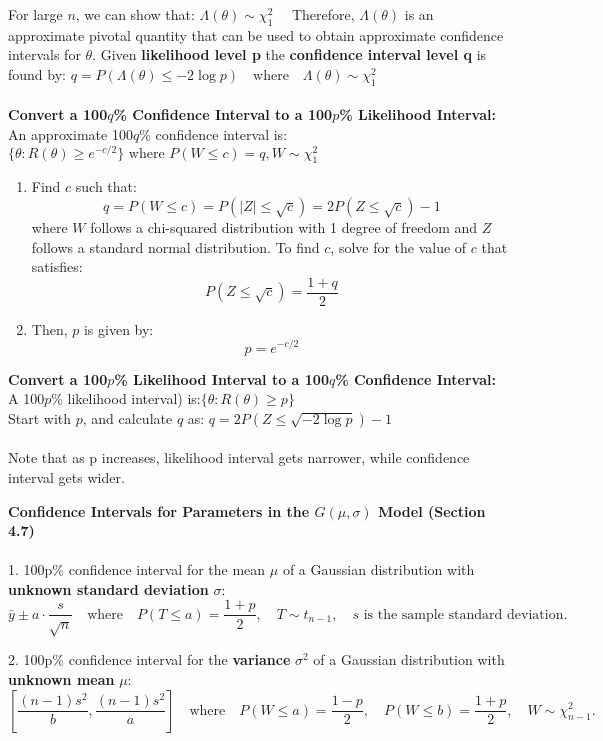 \documentclass[a4paper,12pt]{article}
\begin{document}
For large \( n \), we can show that: $
\Lambda(\theta) \sim \chi^2_1 \quad $
Therefore, \( \Lambda(\theta) \) is an approximate pivotal quantity that can be used to obtain approximate confidence intervals for \( \theta \). Given \textbf{likelihood level p} the \textbf{confidence interval level q} is found by:
$q = P(\Lambda(\theta) \leq -2 \log p) \quad \text{where} \quad \Lambda(\theta) \sim \chi^2_1
$
\\
\\ \textbf{Convert a 100$q$\% Confidence Interval to a 100$p$\% Likelihood Interval:}
\\An approximate 100$q$\% confidence interval is:
$
\{ \theta : R(\theta) \geq e^{-c/2} \} \text{ where }  P(W \leq c) = q,  W \sim \chi^2_1$
\begin{enumerate}
    \item Find \( c \) such that:
    \[
    q = P(W \leq c) = P(|Z| \leq \sqrt{c}) = 2P(Z \leq \sqrt{c}) - 1
    \]
    where \( W \) follows a chi-squared distribution with 1 degree of freedom and \( Z \) follows a standard normal distribution. To find \( c \), solve for the value of \( c \) that satisfies:
    \[
    P(Z \leq \sqrt{c}) = \frac{1 + q}{2}
    \]
    \item Then, \( p \) is given by:
    \[
    p = e^{-c/2}
    \]
\end{enumerate}

\textbf{Convert a 100$p$\% Likelihood Interval to a 100$q$\% Confidence Interval:}
\\ A 100$p$\% likelihood interval) is:$
\{ \theta : R(\theta) \geq p \}$
\\Start with \( p \), and calculate \( q \) as:
$q = 2P(Z \leq \sqrt{-2 \log p}) - 1$
\\
\\Note that as p increases, likelihood interval gets narrower, while confidence interval gets wider.

\newpage
\textbf{Confidence Intervals for Parameters in the $G(\mu, \sigma)$ Model (Section 4.7)}
\\
\\1. 100p\% confidence interval for the mean \(\mu\) of a Gaussian distribution with \\\textbf{unknown standard deviation} \(\sigma\):
\[
\bar{y} \pm a \cdot \frac{s}{\sqrt{n}} \quad \text{where} \quad P(T \leq a) = \frac{1 + p}{2}, \quad T \sim t_{n-1}, \quad s \text{ is the sample standard deviation.}
\]

2. 100p\% confidence interval for the \textbf{ variance} \(\sigma^2\) of a Gaussian distribution with \\\textbf{unknown mean} \(\mu\):
\[
\left[ \frac{(n-1) s^2}{b}, \frac{(n-1) s^2}{a} \right] \quad \text{where} \quad P(W \leq a) = \frac{1 - p}{2}, \quad P(W \leq b) = \frac{1 + p}{2}, \quad W \sim \chi^2_{n-1}.
\]
\end{document}
